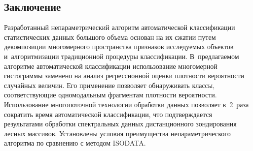 \begin{multicols}{2}
\section{Заключение}
  
  Разработанный непараметрический алгоритм автоматической классификации 
статистических данных большого объема основан на их сжатии путем 
декомпозиции многомерного пространства признаков исследуемых объектов 
и~алгоритмизации традиционной процедуры классификации. В~пред\-ла\-га\-емом 
алгоритме автоматической классификации использование многомерной 
гистограммы заменено на анализ регрессионной оценки плот\-ности ве\-ро\-ят\-ности 
случайных величин. Его применение позволяет обнаруживать классы, 
соответствующие одномодальным фрагментам плот\-ности ве\-ро\-ят\-ности. 
Использование многопоточной технологии обработки данных поз\-во\-ля\-ет 
в~2~раза сократить время автоматической классификации, что под\-тверж\-да\-ет\-ся 
результатами обработки спект\-раль\-ных данных дистанционного зондирования 
лесных массивов. Установлены условия преимущества непараметрического 
алгоритма по сравнению с методом ISODATA.


\end{multicols}
